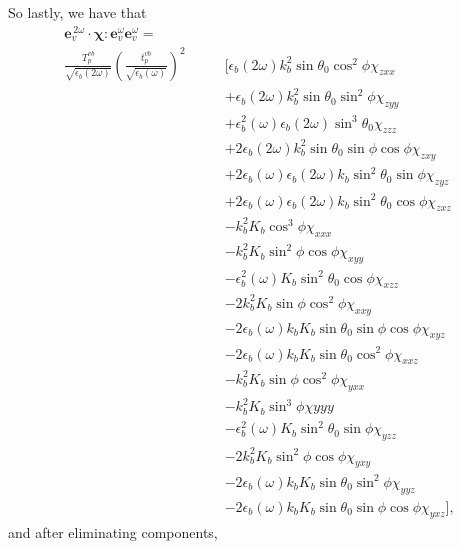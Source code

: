So lastly, we have that
\begin{equation*}
\begin{split}
\mathbf{e}^{\,2\omega}_{v}\cdot
\boldsymbol{\chi}:\mathbf{e}^{\omega}_{v}\mathbf{e}^{\omega}_{v}
=\qquad\qquad&\\
\frac{T^{v b}_{p}}{\sqrt{\epsilon_{b}(2\omega)}}
\left(\frac{t^{v b}_{p}}{\sqrt{\epsilon_{b}(\omega)}}\right)^{2}
&\big[
    \epsilon_{b}(2\omega)k^{2}_{b}
    \sin\theta_{0}\cos^{2}\phi\chi_{zxx}\\
&+  \epsilon_{b}(2\omega)k^{2}_{b}
    \sin\theta_{0}\sin^{2}\phi\chi_{zyy}\\
&+  \epsilon^{2}_{b}(\omega)\epsilon_{b}(2\omega)
    \sin^{3}\theta_{0}\chi_{zzz}\\
&+ 2\epsilon_{b}(2\omega)k^{2}_{b}\sin\theta_{0}
    \sin\phi\cos\phi\chi_{zxy}\\
&+ 2\epsilon_{b}(\omega)\epsilon_{b}(2\omega)k_{b}
    \sin^{2}\theta_{0}\sin\phi\chi_{zyz}\\
&+ 2\epsilon_{b}(\omega)\epsilon_{b}(2\omega)k_{b}
    \sin^{2}\theta_{0}\cos\phi\chi_{zxz}\\
&-  k^{2}_{b}K_{b}\cos^{3}\phi\chi_{xxx}\\
&-  k^{2}_{b}K_{b}\sin^{2}\phi\cos\phi\chi_{xyy}\\
&-  \epsilon^{2}_{b}(\omega)K_{b}
    \sin^{2}\theta_{0}\cos\phi\chi_{xzz}\\
&- 2k^{2}_{b}K_{b}\sin\phi\cos^{2}\phi\chi_{xxy}\\
&- 2\epsilon_{b}(\omega)k_{b}K_{b}
    \sin\theta_{0}\sin\phi\cos\phi\chi_{xyz}\\
&- 2\epsilon_{b}(\omega)k_{b}K_{b}
    \sin\theta_{0}\cos^{2}\phi\chi_{xxz}\\
&-  k^{2}_{b}K_{b}\sin\phi\cos^{2}\phi\chi_{yxx}\\
&-  k^{2}_{b}K_{b}\sin^{3}\phi\chi{yyy}\\
&-  \epsilon^{2}_{b}(\omega)K_{b}
    \sin^{2}\theta_{0}\sin\phi\chi_{yzz}\\
&- 2k^{2}_{b}K_{b}\sin^{2}\phi\cos\phi\chi_{yxy}\\
&- 2\epsilon_{b}(\omega)k_{b}K_{b}
    \sin\theta_{0}\sin^{2}\phi\chi_{yyz}\\
&- 2\epsilon_{b}(\omega)k_{b}K_{b}
    \sin\theta_{0}\sin\phi\cos\phi\chi_{yxz}
\big],
\end{split}
\end{equation*}
and after eliminating components,
